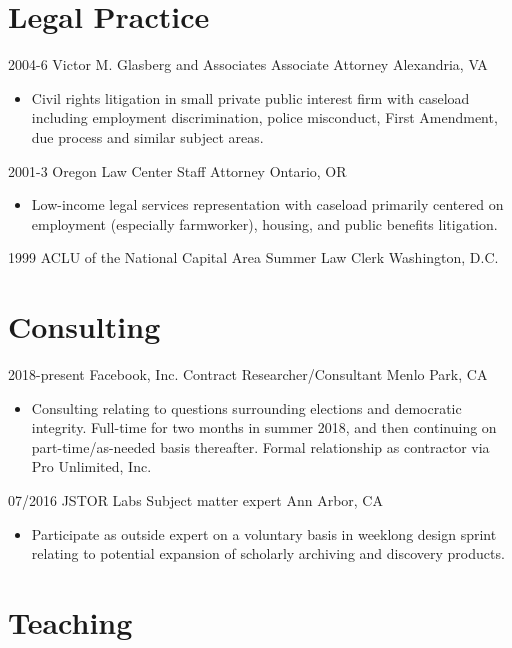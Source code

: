\documentclass[letterpaper]{moderncv}
\begin{document}
\section{Legal Practice}

\cventry
{2004-6}
{Victor M. Glasberg and Associates}
{Associate Attorney}
{Alexandria, VA}
{}
{\begin{itemize}%
	\item Civil rights litigation in small private public interest firm with caseload including employment discrimination,
    police misconduct, First Amendment, due process and similar subject areas.
	\end{itemize}}

\cventry
{2001-3}
{Oregon Law Center}
{Staff Attorney}
{Ontario, OR}
{}
{\begin{itemize}%
	\item Low-income legal services representation with caseload primarily centered on employment
    (especially farmworker), housing, and public benefits litigation.
	\end{itemize}}

\cventry
{1999}
{ACLU of the National Capital Area}
{Summer Law Clerk}
{Washington, D.C.}
{}
{}


\section{Consulting}

\cventry
{2018-present}
{Facebook, Inc.}
{Contract Researcher/Consultant}
{Menlo Park, CA}
{}
{\begin{itemize}%
	\item Consulting relating to questions surrounding elections and democratic
    integrity. Full-time for two months in summer 2018, and then continuing on
    part-time/as-needed basis thereafter. Formal relationship
    as contractor via Pro Unlimited, Inc.
	\end{itemize}}

\cventry
{07/2016}
{JSTOR Labs}
{Subject matter expert}
{Ann Arbor, CA}
{}
{\begin{itemize}%
	\item Participate as outside expert on a voluntary basis in weeklong design
    sprint relating to potential expansion of scholarly archiving and discovery products.
	\end{itemize}}

\section{Teaching}
\end{document}
